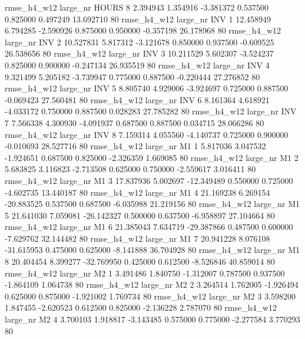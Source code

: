  rmse_h4_w12   large_nr    HOURS                 8  2.394943  1.354916  -3.381372 0.537500 0.825000  0.497249   13.692710 80
 rmse_h4_w12   large_nr      INV                 1 12.458949  6.794285  -2.590926 0.875000 0.950000 -0.357198   26.178968 80
 rmse_h4_w12   large_nr      INV                 2 10.527831  5.817312  -3.121678 0.850000 0.937500 -0.609525   26.538656 80
 rmse_h4_w12   large_nr      INV                 3 10.211529  5.602307  -3.524237 0.825000 0.900000 -0.247134   26.935519 80
 rmse_h4_w12   large_nr      INV                 4  9.321499  5.205182  -3.739947 0.775000 0.887500 -0.220444   27.276852 80
 rmse_h4_w12   large_nr      INV                 5  8.805740  4.929006  -3.924697 0.725000 0.887500 -0.069423   27.560481 80
 rmse_h4_w12   large_nr      INV                 6  8.161364  4.618921  -4.033172 0.750000 0.887500  0.028283   27.785282 80
 rmse_h4_w12   large_nr      INV                 7  7.566338  4.300930  -4.091937 0.687500 0.887500  0.034715   28.066286 80
 rmse_h4_w12   large_nr      INV                 8  7.159314  4.055560  -4.140737 0.725000 0.900000 -0.010693   28.527716 80
 rmse_h4_w12   large_nr       M1                 1  5.817036  3.047532  -1.924651 0.687500 0.825000 -2.326359    1.669085 80
 rmse_h4_w12   large_nr       M1                 2  5.683825  3.116823  -2.713508 0.625000 0.750000 -2.559617    3.016411 80
 rmse_h4_w12   large_nr       M1                 3 17.837936  5.002697 -12.349489 0.550000 0.725000 -4.602735   13.440187 80
 rmse_h4_w12   large_nr       M1                 4 21.169238  6.269154 -20.883525 0.537500 0.687500 -6.035988   21.219156 80
 rmse_h4_w12   large_nr       M1                 5 21.641030  7.059081 -26.142327 0.500000 0.637500 -6.958897   27.104664 80
 rmse_h4_w12   large_nr       M1                 6 21.385043  7.634719 -29.387866 0.487500 0.600000 -7.629762   32.144482 80
 rmse_h4_w12   large_nr       M1                 7 20.941228  8.076108 -31.615953 0.475000 0.625000 -8.141888   36.704928 80
 rmse_h4_w12   large_nr       M1                 8 20.404454  8.399277 -32.769950 0.425000 0.612500 -8.526846   40.859014 80
 rmse_h4_w12   large_nr       M2                 1  3.491486  1.840750  -1.312007 0.787500 0.937500 -1.864109    1.064738 80
 rmse_h4_w12   large_nr       M2                 2  3.264514  1.762005  -1.926494 0.625000 0.875000 -1.921002    1.769734 80
 rmse_h4_w12   large_nr       M2                 3  3.598200  1.847455  -2.620523 0.612500 0.825000 -2.136228    2.787070 80
 rmse_h4_w12   large_nr       M2                 4  3.700103  1.918817  -3.143485 0.575000 0.775000 -2.277584    3.770293 80
